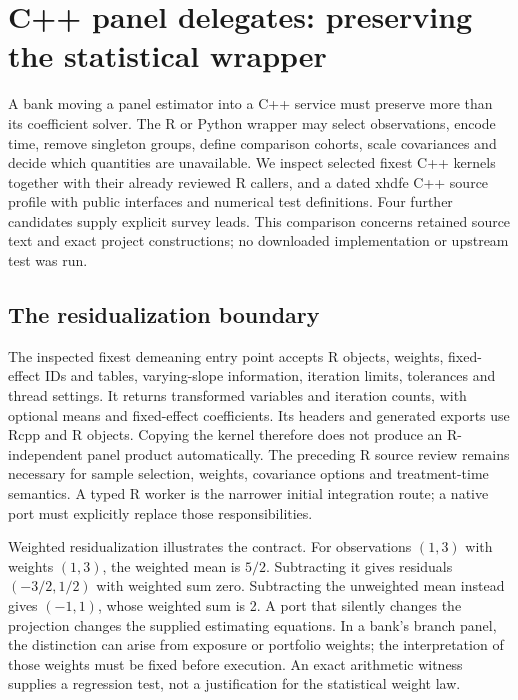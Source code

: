 
\section{C++ panel delegates: preserving the statistical wrapper}
\label{sec:exec25-panels-cxx}
A bank moving a panel estimator into a C++ service must preserve more than
its coefficient solver. The R or Python wrapper may select observations,
encode time, remove singleton groups, define comparison cohorts, scale
covariances and decide which quantities are unavailable. We inspect selected
fixest C++ kernels together with their already reviewed R callers, and a
dated xhdfe C++ source profile with public interfaces and numerical test
definitions. Four further candidates supply explicit survey leads. This
comparison concerns retained source text and exact project constructions;
no downloaded implementation or upstream test was run.
\citep{exec25_panelcxx_fixest,exec20_fixest_source,exec25_panelcxx_xhdfe,exec25_panelcxx_reference}

\subsection{The residualization boundary}
The inspected fixest demeaning entry point accepts R objects, weights,
fixed-effect IDs and tables, varying-slope information, iteration limits,
tolerances and thread settings. It returns transformed variables and iteration
counts, with optional means and fixed-effect coefficients. Its headers and
generated exports use Rcpp and R objects. Copying the kernel therefore does
not produce an R-independent panel product automatically. The preceding
R source review remains necessary for sample selection, weights, covariance
options and treatment-time semantics. A typed R worker is the narrower
initial integration route; a native port must explicitly replace those
responsibilities.~\citep{exec25_panelcxx_fixest,exec20_fixest_source}

Weighted residualization illustrates the contract. For observations $(1,3)$
with weights $(1,3)$, the weighted mean is $5/2$. Subtracting it gives
residuals $(-3/2,1/2)$ with weighted sum zero. Subtracting the unweighted
mean instead gives $(-1,1)$, whose weighted sum is 2. A port that silently
changes the projection changes the supplied estimating equations. In a
bank's branch panel, the distinction can arise from exposure or portfolio
weights; the interpretation of those weights must be fixed before execution.
An exact arithmetic witness supplies a regression test, not a justification
for the statistical weight law.~\citep{exec25_panelcxx_reference}

